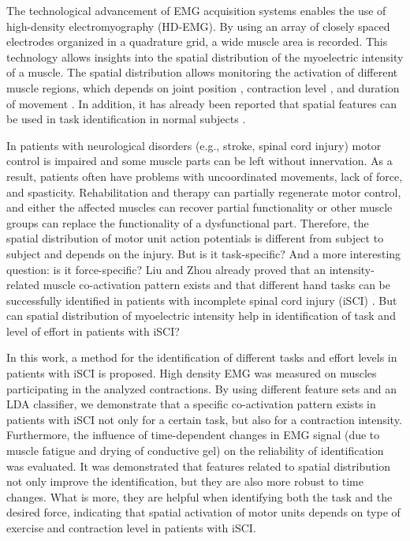 The technological advancement of EMG acquisition systems \citep{Merletti2009, Merletti2010} enables the use of high-density electromyography (HD-EMG). By using an array of closely spaced electrodes organized in a quadrature grid, a wide muscle area is recorded. This technology allows insights into the spatial distribution of the myoelectric intensity of a muscle. The spatial distribution allows monitoring the activation of different muscle regions, which depends on joint position \citep{Vieira2010}, contraction level \citep{Holtermann2005}, and duration of movement \citep{Tucker2009}. In addition, it has already been reported that spatial features can be used in task identification in normal subjects \citep{Stango2015, Rojas-Martinez2013}.

In patients with neurological disorders (e.g., stroke, spinal cord injury) motor control is impaired and some muscle parts can be left without innervation. As a result, patients often have problems with uncoordinated movements, lack of force, and spasticity. Rehabilitation and therapy can partially regenerate motor control, and either the affected muscles can recover partial functionality or other muscle groups can replace the functionality of a dysfunctional part. Therefore, the spatial distribution of motor unit action potentials is different from subject to subject and depends on the injury. But is it task-specific? And a more interesting question: is it force-specific? Liu and Zhou already proved that an intensity-related muscle co-activation pattern exists and that different hand tasks can be successfully identified in patients with incomplete spinal cord injury (iSCI) \citep{Liu2013}. But can spatial distribution of myoelectric intensity help in identification of task and level of effort in patients with iSCI?

In this work, a method for the identification of different tasks and effort levels in patients with iSCI is proposed. High density EMG was measured on muscles participating in the analyzed contractions. By using different feature sets and an LDA classifier, we demonstrate that a specific co-activation pattern exists in patients with iSCI not only for a certain task, but also for a contraction intensity. Furthermore, the influence of time-dependent changes in EMG signal (due to muscle fatigue and drying of conductive gel) on the reliability of identification was evaluated. It was demonstrated that features related to spatial distribution not only improve the identification, but they are also more robust to time changes. What is more, they are helpful when identifying both the task and the desired force, indicating that spatial activation of motor units depends on type of exercise and contraction level in patients with iSCI.


